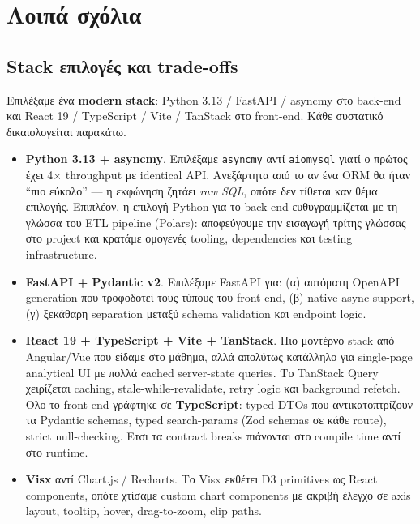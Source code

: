\chapter{Λοιπά σχόλια}

\section{Stack επιλογές και trade-offs}

Επιλέξαμε ένα \textbf{modern stack}: Python 3.13 / FastAPI / asyncmy στο
back-end και React 19 / TypeScript / Vite / TanStack στο front-end. Κάθε
συστατικό δικαιολογείται παρακάτω.

\begin{itemize}
    \item \textbf{Python 3.13 + asyncmy}. Επιλέξαμε \texttt{asyncmy} αντί
          \texttt{aiomysql} γιατί ο πρώτος έχει 4$\times$ throughput με
          identical API. Ανεξάρτητα από το αν ένα ORM θα ήταν ``πιο εύκολο''
          --- η εκφώνηση ζητάει \emph{raw SQL}, οπότε δεν τίθεται καν θέμα
          επιλογής. Επιπλέον, η επιλογή Python για το back-end
          ευθυγραμμίζεται με τη γλώσσα του ETL pipeline (Polars):
          αποφεύγουμε την εισαγωγή τρίτης γλώσσας στο project και
          κρατάμε ομογενές tooling, dependencies και testing
          infrastructure.
    \item \textbf{FastAPI + Pydantic v2}. Επιλέξαμε FastAPI για:
          (α) αυτόματη OpenAPI generation που τροφοδοτεί τους τύπους του
          front-end, (β) native async support, (γ) ξεκάθαρη separation
          μεταξύ schema validation και endpoint logic.
    \item \textbf{React 19 + TypeScript + Vite + TanStack}. Πιο μοντέρνο
          stack από Angular/Vue που είδαμε στο μάθημα, αλλά απολύτως
          κατάλληλο για single-page analytical UI με πολλά cached
          server-state queries. Το TanStack Query χειρίζεται caching,
          stale-while-revalidate, retry logic και background refetch.
          Ολο το front-end γράφτηκε σε \textbf{TypeScript}: typed DTOs
          που αντικατοπτρίζουν τα Pydantic schemas, typed search-params
          (Zod schemas σε κάθε route), strict null-checking. Ετσι τα
          contract breaks πιάνονται στο compile time αντί στο runtime.
    \item \textbf{Visx} αντί Chart.js / Recharts. Το Visx εκθέτει D3
          primitives ως React components, οπότε χτίσαμε custom chart
          components με ακριβή έλεγχο σε axis layout, tooltip, hover,
          drag-to-zoom, clip paths.
\end{itemize}

